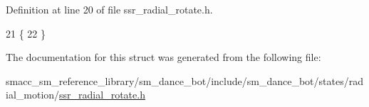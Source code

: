 Definition at line 20 of file ssr\+\_\+radial\+\_\+rotate.\+h.


\begin{DoxyCode}
21   \{
22   \}
\end{DoxyCode}


The documentation for this struct was generated from the following file\+:\begin{DoxyCompactItemize}
\item 
smacc\+\_\+sm\+\_\+reference\+\_\+library/sm\+\_\+dance\+\_\+bot/include/sm\+\_\+dance\+\_\+bot/states/radial\+\_\+motion/\hyperlink{ssr__radial__rotate_8h}{ssr\+\_\+radial\+\_\+rotate.\+h}\end{DoxyCompactItemize}
